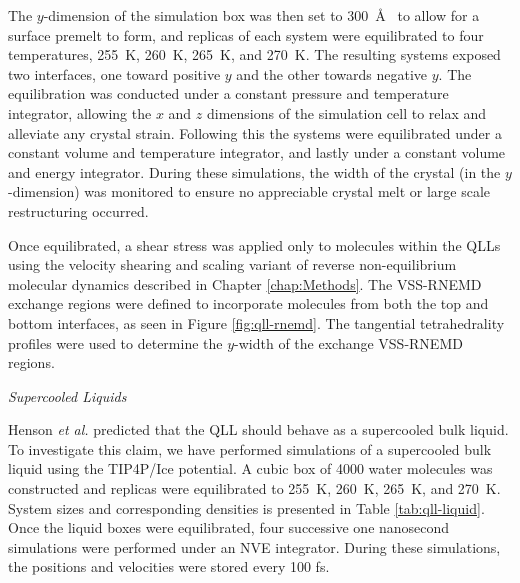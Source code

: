The $y$-dimension of the simulation box was then set to 300~\AA~ to
allow for a surface premelt to form, and replicas of each system were
equilibrated to four temperatures, 255~K, 260~K, 265~K, and 270~K. The
resulting systems exposed two interfaces, one toward positive $y$ and
the other towards negative $y$. The equilibration was conducted under
a constant pressure and temperature integrator, allowing the $x$ and
$z$ dimensions of the simulation cell to relax and alleviate any
crystal strain. Following this the systems were equilibrated under a
constant volume and temperature integrator, and lastly under a
constant volume and energy integrator. During these simulations, the
width of the crystal (in the $y$-dimension) was monitored to ensure no
appreciable crystal melt or large scale restructuring occurred.

Once equilibrated, a shear stress was applied only to molecules within
the QLLs using the velocity shearing and scaling variant of reverse
non-equilibrium molecular dynamics described in Chapter
\ref{chap:Methods}.\cite{Kuang2012} The VSS-RNEMD exchange regions
were defined to incorporate molecules from both the top and bottom
interfaces, as seen in Figure \ref{fig:qll-rnemd}. The tangential
tetrahedrality profiles were used to determine the $y$-width of the
exchange VSS-RNEMD regions. 



\begin{flushleft}
\textit{Supercooled Liquids}
\end{flushleft}
Henson \textit{et al.} predicted that the QLL should behave as a
supercooled bulk liquid.\cite{Henson2005} To investigate this claim,
we have performed simulations of a supercooled bulk liquid using the
TIP4P/Ice potential. A cubic box of 4000 water molecules was
constructed and replicas were equilibrated to 255~K, 260~K, 265~K, and
270~K. System sizes and corresponding densities is presented in Table
\ref{tab:qll-liquid}. Once the liquid boxes were equilibrated, four
successive one nanosecond simulations were performed under an NVE
integrator. During these simulations, the positions and velocities
were stored every 100 fs.


